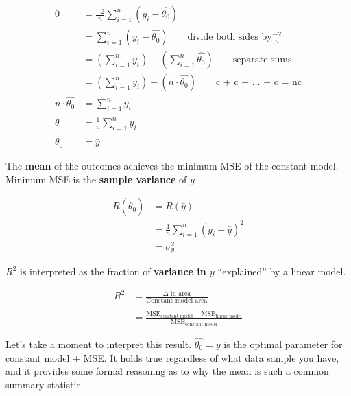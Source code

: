 \documentclass[
  letterpaper,
  DIV=11,
  numbers=noendperiod]{scrreprt}
\begin{document}
\begin{align}
0 &= {\frac{-2}{n}}\sum^{n}_{i=1} (y_i - \hat{\theta_0})
\\ &= \sum^{n}_{i=1} (y_i - \hat{\theta_0}) \quad \quad \text{divide both sides by} \frac{-2}{n}
\\ &= \left(\sum^{n}_{i=1} y_i\right) - \left(\sum^{n}_{i=1} \hat{\theta_0}\right) \quad \quad \text{separate sums}
\\ &= \left(\sum^{n}_{i=1} y_i\right) - (n \cdot \hat{\theta_0}) \quad \quad  \text{c + c + … + c = nc}
\\ n \cdot \hat{\theta_0} &= \sum^{n}_{i=1} y_i
\\ \hat{\theta_0} &= \frac{1}{n} \sum^{n}_{i=1} y_i
\\ \hat{\theta_0} &= \bar{y}
\end{align}

\begin{tcolorbox}[enhanced jigsaw, titlerule=0mm, bottomtitle=1mm, arc=.35mm, colframe=quarto-callout-note-color-frame, rightrule=.15mm, opacityback=0, opacitybacktitle=0.6, leftrule=.75mm, breakable, toprule=.15mm, colback=white, left=2mm, colbacktitle=quarto-callout-note-color!10!white, toptitle=1mm, bottomrule=.15mm, title=\textcolor{quarto-callout-note-color}{\faInfo}\hspace{0.5em}{Note}, coltitle=black]

The \textbf{mean} of the outcomes achieves the minimum MSE of the
constant model. Minimum MSE is the \textbf{sample variance} of \(y\)

\begin{align}
R(\hat{\theta_0}) & = R(\bar{y}) \\
& = \frac{1}{n}\sum_{i=1}^{n}(y_i-\bar{y})^2\\
&= \sigma_y^2
\end{align}

\(R^2\) is interpreted as the fraction of \textbf{variance in \(y\)}
``explained'' by a linear model.

\begin{align}
R^2 &= \frac{\Delta \text{ in area}}{\text{Constant model area}}\\\\
&= \frac{\text{MSE}_\text{constant model} - \text{MSE}_\text{linear model}}{\text{MSE}_\text{constant model}}
\end{align}

\end{tcolorbox}

Let's take a moment to interpret this result.
\(\hat{\theta_0} = \bar{y}\) is the optimal parameter for constant model
+ MSE. It holds true regardless of what data sample you have, and it
provides some formal reasoning as to why the mean is such a common
summary statistic.
\end{document}
